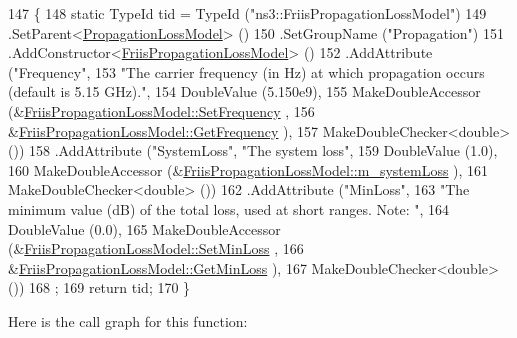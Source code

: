 \begin{DoxyCode}
147 \{
148   \textcolor{keyword}{static} TypeId tid = TypeId (\textcolor{stringliteral}{"ns3::FriisPropagationLossModel"})
149     .SetParent<\hyperlink{classns3_1_1PropagationLossModel_ace8b78c2c8e805cd0a919d7e3543318c}{PropagationLossModel}> ()
150     .SetGroupName (\textcolor{stringliteral}{"Propagation"})
151     .AddConstructor<\hyperlink{classns3_1_1FriisPropagationLossModel_acbc7dfc774fe6cc07f6a72526f31c3d6}{FriisPropagationLossModel}> ()
152     .AddAttribute (\textcolor{stringliteral}{"Frequency"}, 
153                    \textcolor{stringliteral}{"The carrier frequency (in Hz) at which propagation occurs  (default is 5.15 GHz)."},
154                    DoubleValue (5.150e9),
155                    MakeDoubleAccessor (&\hyperlink{classns3_1_1FriisPropagationLossModel_a6baac266c391cd9d074341e3f8b8e183}{FriisPropagationLossModel::SetFrequency}
      ,
156                                        &\hyperlink{classns3_1_1FriisPropagationLossModel_ac24757b6c9e436c8233fea4bfd010c25}{FriisPropagationLossModel::GetFrequency}
      ),
157                    MakeDoubleChecker<double> ())
158     .AddAttribute (\textcolor{stringliteral}{"SystemLoss"}, \textcolor{stringliteral}{"The system loss"},
159                    DoubleValue (1.0),
160                    MakeDoubleAccessor (&\hyperlink{classns3_1_1FriisPropagationLossModel_ad547e83f7bdb1f4ba7205909886f16f3}{FriisPropagationLossModel::m\_systemLoss}
      ),
161                    MakeDoubleChecker<double> ())
162     .AddAttribute (\textcolor{stringliteral}{"MinLoss"}, 
163                    \textcolor{stringliteral}{"The minimum value (dB) of the total loss, used at short ranges. Note: "},
164                    DoubleValue (0.0),
165                    MakeDoubleAccessor (&\hyperlink{classns3_1_1FriisPropagationLossModel_accf6f11a8cb14e6dff686b599c7d1d24}{FriisPropagationLossModel::SetMinLoss}
      ,
166                                        &\hyperlink{classns3_1_1FriisPropagationLossModel_a818dac300f6ac2024457b95647ac0015}{FriisPropagationLossModel::GetMinLoss}
      ),
167                    MakeDoubleChecker<double> ())
168   ;
169   \textcolor{keywordflow}{return} tid;
170 \}
\end{DoxyCode}


Here is the call graph for this function\+:


